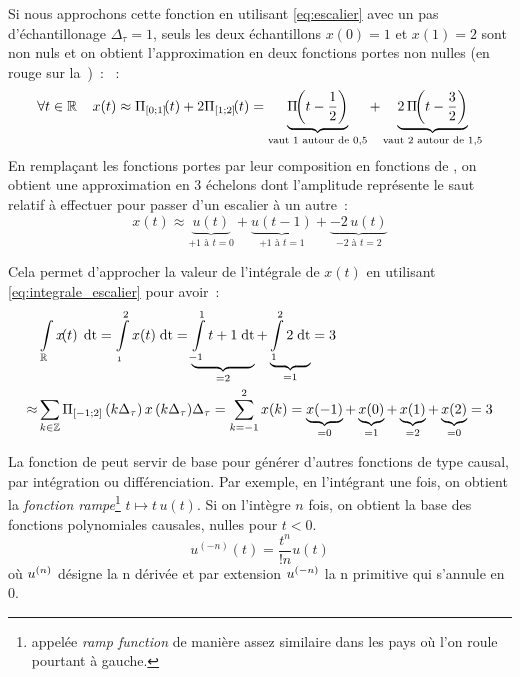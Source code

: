 \begin{remark}{}
\begin{exemple}
        Si nous approchons cette fonction en utilisant 
        \eqref{eq:escalier} avec un pas d'échantillonage
        $\Delta_\tau=1$, seuls les deux échantillons $x(0)=1$ et
        $x(1)=2$ sont non nuls et on obtient l'approximation en deux
        fonctions portes non nulles (en rouge sur
        la~)~: ~:
        \begin{equation*}
          \forall t\in\R\quads x(t)\approx \porteDe{0}{1}\de{t}+2\porteDe{1}{2}\de{t} = \underbrace{\porte\de{t-\frac{1}{2}}}_{\text{vaut 1 autour de }0,5}+\underbrace{2\,\porte\de{t-\frac{3}{2}}}_{\text{vaut 2 autour de }1,5}
        \end{equation*}
        En remplaçant les fonctions portes par leur composition en
        fonctions de \Heaviside{}, on obtient une approximation en 3
        échelons dont l'amplitude représente le saut relatif à
        effectuer pour passer d'un escalier à un autre~:
        \begin{equation*}
          x(t) \approx \underbrace{u(t)}_{+1\text{ à }t=0} + \underbrace{u(t-1)}_{+1\text{ à }t=1} +\underbrace{ -2\,u(t)}_{-2\text{ à }t=2}
        \end{equation*}

        Cela permet d'approcher la valeur de l'intégrale de $x(t)$
        en utilisant \eqref{eq:integrale_escalier} pour avoir~:
        \begin{eqnarray*}
          &\int\limits_{\mathbb{R}}^{}{x\!\!\left(t\right)\;\mathrm{d{t}}}=\int\limits_{_1}^{2}{x(t)\;\mathrm{d{t}}}=\underbrace{\int\limits_{-1}^{1}{t+1\;\mathrm{d{t}}}}_{=2}+\underbrace{\int\limits_{1}^{2}{2\;\mathrm{d{t}}}}_{=1} = 3 \\
          \approx  &\sum\limits_{k\in\mathbb{Z}}^{}{\Pi_{\left[-1 ; 2\right]}\left(k\Delta_\tau\right)x\left(k\Delta_\tau\right)}\Delta_\tau =  \sum\limits_{k=-1}^{2}{x(k)} = \underbrace{x(-1)}_{=0} + \underbrace{x(0)}_{=1} + \underbrace{x(1)}_{=2} + \underbrace{x(2)}_{=0} = 3
        \end{eqnarray*} 
      \end{exemple}
      
      La fonction de \Heaviside{} peut servir de base pour générer
      d'autres fonctions de type causal, par intégration ou
      différenciation. Par exemple, en l'intégrant une fois, on
      obtient la \emph{fonction rampe}\footnote{appelée \emph{ramp
          function} de manière assez similaire dans les pays où l'on
        roule pourtant à gauche.} $t\mapsto t\,u(t)$. Si on l'intègre
      $n$ fois, on obtient la base des fonctions polynomiales
      causales, \cad{} nulles pour $t<0$.
	\begin{equation}\label{eq:integration_Heaviside}
          u^{(-n)}(t) = \frac{t^{n}}{!n}  u(t)	 	
	\end{equation}	où $u^{\left(n\right)}$ désigne la n\ieme{} dérivée et par extension $u^{\left(-n\right)}$ la n\ieme{} primitive qui s'annule en $0$.
        

\end{remark}
